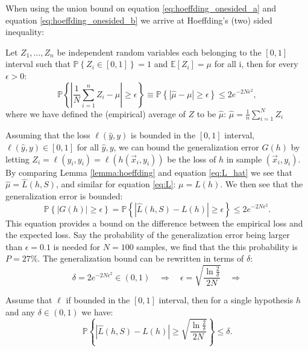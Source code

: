 When using the union bound on equation \eqref{eq:hoeffding_onesided_a} and equation \eqref{eq:hoeffding_onesided_b} we arrive at Hoeffding's (two) sided inequality:
\begin{lemma}
  \label{lemma:hoeffding}
  Let $Z_1, \dots, Z_n$ be independent random variables each belonging to the $[0, 1]$ interval such that $\mathbb{P}\left\{Z_i \in [0, 1] \right\} = 1$ and $\mathbb{E}[Z_i] = \mu$ for all i, then for every $\epsilon > 0$:
  \begin{equation}
    \mathbb{P} \left\{ \left| \frac{1}{N}\sum_{i=1}^n Z_i - \mu \right| \geq \epsilon \right\} \equiv \mathbb{P} \left\{ \left| \hat{\mu} - \mu \right| \geq \epsilon \right\} \leq 2 e^{-2N\epsilon^2},
    \label{eq:hoeffding_inequality}
  \end{equation}
  where we have defined the (empirical) average of $Z$ to be $\hat{\mu}$: $\hat{\mu}=\frac{1}{n}\sum_{i=1}^N Z_i $
\end{lemma}
Assuming that the loss $\ell(\hat{y}, y)$ is bounded in the $[0, 1]$ interval, $\ell(\hat{y}, y) \in [0, 1]$ for all $\hat{y}, y$, we can bound the generalization error $G(h)$ by letting $Z_i = \ell(\hat{y}_i, y_i) = \ell(h(\vec{x}_i, y_i))$ be the loss of $h$ in sample $(\vec{x}_i, y_i)$. By comparing Lemma \ref{lemma:hoeffding} and equation \eqref{eq:L_hat} we see that $\hat{\mu} = \hat{L}(h, S)$, and similar for equation \eqref{eq:L}: $\mu = L(h)$. We then see that the generalization error is bounded:
\begin{equation}
  \label{eq:hoeffding_inequality_generalization_error}
  \mathbb{P} \left\{ \left| G(h) \right| \geq \epsilon \right\} = \mathbb{P} \left\{ \left| \hat{L}(h, S) - L(h) \right| \geq \epsilon \right\} \leq 2 e^{-2N\epsilon^2}.
\end{equation}
This equation provides a bound on the difference between the empirical loss and the expected loss. Say the probability of the generalization error being larger than $\epsilon = 0.1$ is needed for $N=100$ samples, we find that the this probability is $P=27\%$. The generalization bound  can be rewritten in terms of $\delta$:
\begin{equation}
  \delta = 2 e^{-2N\epsilon^2} \in (0, 1) \quad \Rightarrow \quad \epsilon = \sqrt{\frac{\ln \frac{2}{\delta}}{2N}} \quad \Rightarrow
\end{equation}
\begin{theorem}
  \label{theorem:hoeffding_single}
  Assume that $\ell$ if bounded in the $[0, 1]$ interval, then for a single hypothesis $h$ and any $\delta\in(0,1)$ we have:  
  \begin{equation}
    \label{eq:hoeffding_inequality_generalization_error_delta}
    \mathbb{P} \left\{ \left| \hat{L}(h, S) - L(h) \right| \geq \sqrt{\frac{\ln \frac{2}{\delta}}{2N}}  \right\} \leq \delta.
  \end{equation}
\end{theorem}
